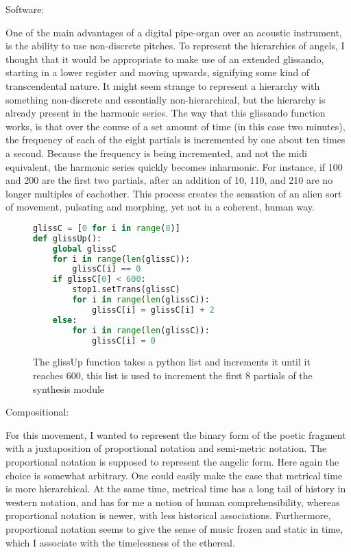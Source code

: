 \documentclass[12pt,twoside,maitrise]{dms}
\theoremstyle{definition}
\begin{document}
Software:

One of the main advantages of a digital pipe-organ over an acoustic instrument, is the ability to use non-discrete pitches.
To represent the hierarchies of angels, I thought that it would be appropriate to make use of an extended glissando, starting in a lower register and moving upwards, signifying some kind of transcendental nature.
It might seem strange to represent a hierarchy with something non-discrete and essentially non-hierarchical, but the hierarchy is already present in the harmonic series.
The way that this glissando function works, is that over the course of a set amount of time (in this case two minutes), the frequency of each of the eight partials is incremented by one about ten times a second.
Because the frequency is being incremented, and not the midi equivalent, the harmonic series quickly becomes inharmonic.
For instance, if 100 and 200 are the first two partials, after an addition of 10, 110, and 210 are no longer multiples of eachother.
This process creates the sensation of an alien sort of movement, pulsating and morphing, yet not in a coherent, human way.    
\begin{figure}[H]
\begin{lstlisting}[language=Python]
glissC = [0 for i in range(8)]
def glissUp():
    global glissC
    for i in range(len(glissC)):
        glissC[i] == 0
    if glissC[0] < 600:
        stop1.setTrans(glissC)
        for i in range(len(glissC)):
            glissC[i] = glissC[i] + 2
    else:
        for i in range(len(glissC)):
            glissC[i] = 0
\end{lstlisting}
\caption{The glissUp function takes a python list and increments it until it reaches 600, this list is used to increment the first 8 partials of the synthesis module}
\end{figure}

Compositional:

For this movement, I wanted to represent the binary form of the poetic fragment with a juxtaposition of proportional notation and semi-metric notation.
The proportional notation is supposed to represent the angelic form.
Here again the choice is somewhat arbitrary.
One could easily make the case that metrical time is more hierarchical.
At the same time, metrical time has a long tail of history in western notation, and has for me a notion of human comprehensibility, whereas proportional notation is newer, with less historical associations.
Furthermore, proportional notation seems to give the sense of music frozen and static in time, which I associate with the timelessness of the ethereal.
\end{document}
